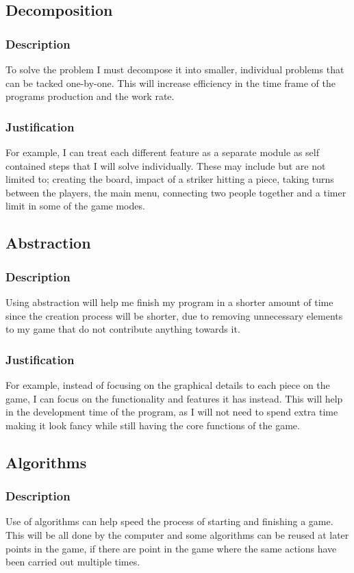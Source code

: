 \documentclass[11pt,a4paper]{report}
\begin{document}
\subsection{Decomposition}
\subsubsection{Description}
To solve the problem I must decompose it into smaller, individual problems that can be tacked one-by-one. This will increase efficiency in the time frame of the programs production and the work rate.
\subsubsection{Justification}
For example, I can treat each different feature as a separate module as self contained steps that I will solve individually. These may include but are not limited to; creating the board, impact of a striker hitting a piece, taking turns between the players, the main menu, connecting two people together and a timer limit in some of the game modes.

\subsection{Abstraction}
\subsubsection{Description}
Using abstraction will help me finish my program in a shorter amount of time since the creation process will be shorter, due to removing unnecessary elements to my game that do not contribute anything towards it.
\subsubsection{Justification}
For example, instead of focusing on the graphical details to each piece on the game, I can focus on the functionality and features it has instead. This will help in the development time of the program, as I will not need to spend extra time making it look fancy while still having the core functions of the game.

\subsection{Algorithms}
\subsubsection{Description}
Use of algorithms can help speed the process of starting and finishing a game. This will be all done by the computer and some algorithms can be reused at later points in the game, if there are point in the game where the same actions have been carried out multiple times.
\end{document}
